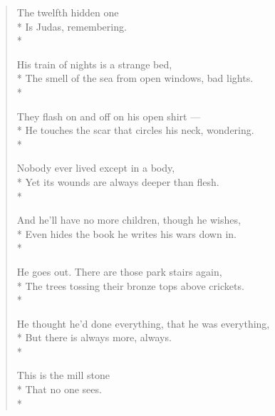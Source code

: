 \documentclass[english,11pt,letterpaper,onecolumn]{scrbook}
\begin{document}
\newpage
{}

\begin{verse}
The twelfth hidden one  \\*
Is Judas, remembering. \\*

His train of nights is a strange bed,  \\*
The smell of the sea from open windows, bad lights. \\*

They flash on and off on his open shirt ---   \\*
He touches the scar that circles his neck, wondering. \\*

Nobody ever lived except in a body,  \\*
Yet its wounds are always deeper than flesh. \\*

And he'll have no more children, though he wishes,  \\*
Even hides the book he writes his wars down in. \\*

He goes out.  There are those park stairs again,  \\*
The trees tossing their bronze tops above crickets. \\*

He thought he'd done everything, that he was everything,  \\*
But there is always more, always. \\*  

This is the mill stone  \\*
That no one sees. \\*
\end{verse}

\newpage
{}
\end{document}
